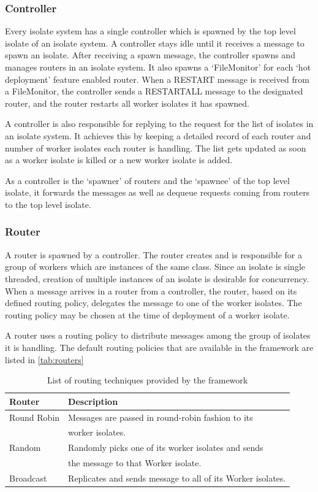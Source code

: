   \subsubsection{Controller}
  Every isolate system has a single controller which is spawned by the top level isolate of an isolate system. A controller stays idle until it receives a message to spawn an isolate. After receiving a spawn message, the controller spawns and manages routers in an isolate system. It also spawns a ‘FileMonitor’ for each ‘hot deployment’ feature enabled router. When a RESTART message is received from a FileMonitor, the controller sends a RESTART\textunderscore{}ALL message to the designated router, and the router restarts all worker isolates it has spawned.

  A controller is also responsible for replying to the request for the list of isolates in an isolate system. It achieves this by keeping a detailed record of each router and number of worker isolates each router is handling. The list gets updated as soon as a worker isolate is killed or a new worker isolate is added.

  As a controller is the ‘spawner’ of routers and the ‘spawnee’ of the top level isolate, it forwards the messages as well as dequeue requests coming from routers to the top level isolate.

  \subsubsection{Router}
  \label{subsubsec:router}
  A router is spawned by a controller. The router creates and is responsible for a group of workers which are instances of the same class. Since an isolate is single threaded, creation of multiple instances of an isolate is desirable for concurrency. When a message arrives in a router from a controller, the router, based on its defined routing policy, delegates the message to one of the worker isolates. The routing policy may be chosen at the time of deployment of a worker isolate.

  A router uses a routing policy to distribute messages among the group of isolates it is handling. The default routing policies that are available in the framework are listed in \autoref{tab:routers}
\begin{table}[htsb]
  \caption[Routing techniques provided by the framework]{List of routing techniques provided by the framework}\label{tab:routers}
  \centering
  \begin{tabular}{l l}
    \toprule
      \bf{Router} & \bf{Description} \\
    \midrule
      Round Robin & Messages are passed in round-robin fashion to its \\ & worker isolates.\\
      Random & Randomly picks one of its worker isolates and sends\\ & the message to that Worker isolate.\\
      Broadcast & Replicates and sends message to all of its Worker isolates.\\
    \bottomrule
  \end{tabular}
\end{table}

